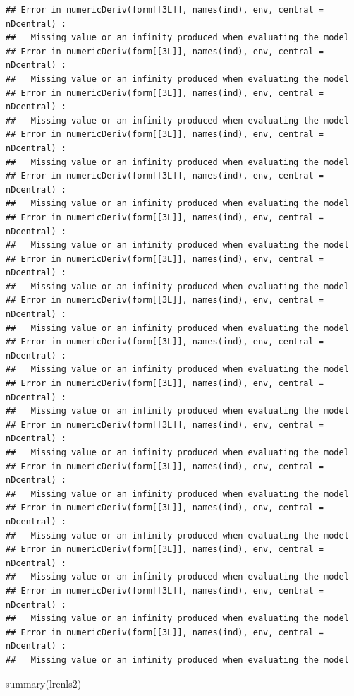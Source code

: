 \documentclass[
]{krantz}
\makeatletter
\newenvironment{Shaded}{\begin{snugshade}}{\end{snugshade}}
\newcommand{\FunctionTok}[1]{\textcolor[rgb]{0.00,0.00,0.00}{#1}}
\newcommand{\NormalTok}[1]{#1}
\newenvironment{kframe}{%
\medskip{}
\setlength{\fboxsep}{.8em}
 \def\at@end@of@kframe{}%
 \ifinner\ifhmode%
  \def\at@end@of@kframe{\end{minipage}}%
  \begin{minipage}{\columnwidth}%
 \fi\fi%
 \def\FrameCommand##1{\hskip\@totalleftmargin \hskip-\fboxsep
 \colorbox{shadecolor}{##1}\hskip-\fboxsep
     \hskip-\linewidth \hskip-\@totalleftmargin \hskip\columnwidth}%
 \MakeFramed {\advance\hsize-\width
   \@totalleftmargin\z@ \linewidth\hsize
   \@setminipage}}%
 {\par\unskip\endMakeFramed%
 \at@end@of@kframe}
\renewenvironment{Shaded}{\begin{kframe}}{\end{kframe}}
\makeatother
\begin{document}
\begin{verbatim}
## Error in numericDeriv(form[[3L]], names(ind), env, central = nDcentral) : 
##   Missing value or an infinity produced when evaluating the model
## Error in numericDeriv(form[[3L]], names(ind), env, central = nDcentral) : 
##   Missing value or an infinity produced when evaluating the model
## Error in numericDeriv(form[[3L]], names(ind), env, central = nDcentral) : 
##   Missing value or an infinity produced when evaluating the model
## Error in numericDeriv(form[[3L]], names(ind), env, central = nDcentral) : 
##   Missing value or an infinity produced when evaluating the model
## Error in numericDeriv(form[[3L]], names(ind), env, central = nDcentral) : 
##   Missing value or an infinity produced when evaluating the model
## Error in numericDeriv(form[[3L]], names(ind), env, central = nDcentral) : 
##   Missing value or an infinity produced when evaluating the model
## Error in numericDeriv(form[[3L]], names(ind), env, central = nDcentral) : 
##   Missing value or an infinity produced when evaluating the model
## Error in numericDeriv(form[[3L]], names(ind), env, central = nDcentral) : 
##   Missing value or an infinity produced when evaluating the model
## Error in numericDeriv(form[[3L]], names(ind), env, central = nDcentral) : 
##   Missing value or an infinity produced when evaluating the model
## Error in numericDeriv(form[[3L]], names(ind), env, central = nDcentral) : 
##   Missing value or an infinity produced when evaluating the model
## Error in numericDeriv(form[[3L]], names(ind), env, central = nDcentral) : 
##   Missing value or an infinity produced when evaluating the model
## Error in numericDeriv(form[[3L]], names(ind), env, central = nDcentral) : 
##   Missing value or an infinity produced when evaluating the model
## Error in numericDeriv(form[[3L]], names(ind), env, central = nDcentral) : 
##   Missing value or an infinity produced when evaluating the model
## Error in numericDeriv(form[[3L]], names(ind), env, central = nDcentral) : 
##   Missing value or an infinity produced when evaluating the model
## Error in numericDeriv(form[[3L]], names(ind), env, central = nDcentral) : 
##   Missing value or an infinity produced when evaluating the model
## Error in numericDeriv(form[[3L]], names(ind), env, central = nDcentral) : 
##   Missing value or an infinity produced when evaluating the model
\end{verbatim}

\begin{Shaded}
\begin{Highlighting}[]
\FunctionTok{summary}\NormalTok{(lrcnls2)}
\end{Highlighting}
\end{Shaded}
\end{document}
